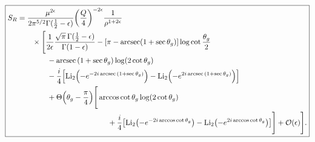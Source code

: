 \documentclass[11pt,twoside,reqno]{amsart}
\theoremstyle{plain}
\theoremstyle{remark}
\theoremstyle{definition}
\theoremstyle{remark}
\theoremstyle{definition}
\theoremstyle{definition}
\newcommand{\cO}{\mathcal{O}}
\newcommand{\Li}{\mathrm{Li}}
\begin{document}
	\begin{equation}\label{eq:full soft function}
	\boxed{
	\begin{aligned}
		S_R &= \frac{\mu^{2\epsilon}}{2\pi^{5/2} \Gamma(\frac{1}{2} - \epsilon)}\qty(\frac{Q}{4})^{-2\epsilon} \frac{1}{\rho^{1 + 2\epsilon}} \\
			&\qquad\times \Bigg[\frac{1}{2\epsilon}\frac{\sqrt{\pi} \, \Gamma(\frac{1}{2} - \epsilon)}{\Gamma(1 - \epsilon)} - \qty[\pi - \arcsec(1 + \sec\theta_g)]\log\cot\frac{\theta_g}{2} \\
			&\qquad\qquad - \arcsec\qty(1 + \sec\theta_g) \log(2\cot\theta_g) \\
			&\qquad\qquad - \frac{i}{4}\qty[\Li_2\qty(-e^{-2i\arcsec\qty(1 + \sec\theta_g)}) - \Li_2\qty(-e^{2i\arcsec\qty(1 + \sec\theta_g)})] \\
			&\qquad\qquad+ \Theta\qty(\theta_g - \frac{\pi}{4})\Bigg[ \arccos\cot\theta_g \log(2\cot\theta_g) \\
			&\hspace{4.25cm}+ \frac{i}{4}\qty[\Li_2\qty(-e^{-2i\arccos\cot\theta_g}) - \Li_2\qty(-e^{2i\arccos\cot\theta_g})] \Bigg] + \cO(\epsilon) \Bigg].
	\end{aligned}
	}
	\end{equation}
\end{document}
